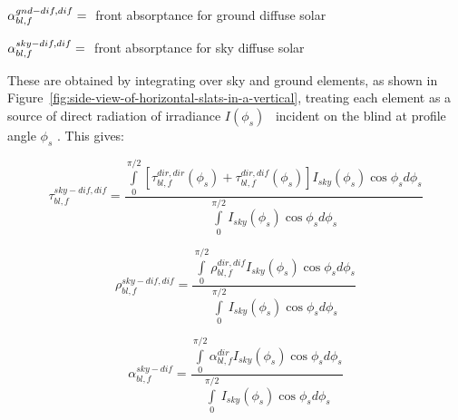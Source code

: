 \(\alpha_{bl,f}^{gnd - dif,dif} = {\rm{ }}\) front absorptance for ground diffuse solar

\(\alpha_{bl,f}^{sky - dif,dif} = {\rm{ }}\) front absorptance for sky diffuse solar

These are obtained by integrating over sky and ground elements, as shown in Figure~\ref{fig:side-view-of-horizontal-slats-in-a-vertical}, treating each element as a source of direct radiation of irradiance \(I({\phi_s})\) ~incident on the blind at profile angle \({\phi_s}\) . This gives:

\begin{equation}
\tau_{bl,f}^{sky - dif,dif} = \frac{{\int\limits_0^{\pi /2} {\left[ {\tau_{bl,f}^{dir,dir}({\phi_s}) + \tau_{bl,f}^{dir,dif}({\phi_s})} \right]{I_{sky}}({\phi_s})\cos {\phi_s}d{\phi_s}} }}{{\int\limits_0^{\pi /2} {{I_{sky}}({\phi_s})\cos {\phi_s}d{\phi_s}} }}
\end{equation}

\begin{equation}
\rho_{bl,f}^{sky - dif,dif} = \frac{{\int\limits_0^{\pi /2} {\rho_{bl,f}^{dir,dif}{I_{sky}}({\phi_s})\cos {\phi_s}d{\phi_s}} }}{{\int\limits_0^{\pi /2} {{I_{sky}}({\phi_s})\cos {\phi_s}d{\phi_s}} }}
\end{equation}

\begin{equation}
\alpha_{bl,f}^{sky - dif} = \frac{{\int\limits_0^{\pi /2} {\alpha_{bl,f}^{dir}{I_{sky}}({\phi_s})\cos {\phi_s}d{\phi_s}} }}{{\int\limits_0^{\pi /2} {{I_{sky}}({\phi_s})\cos {\phi_s}d{\phi_s}} }}
\end{equation}

